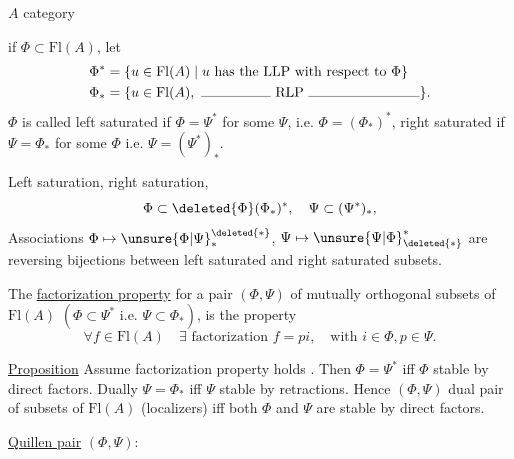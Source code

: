 
$A$ category

if $\Phi\subset\mathrm{Fl}(A)$, let
\[
\begin{aligned}
\Phi^*&=\{u\in\mathrm{Fl}(A)\mid u\text{ has the LLP with respect to }\Phi\}\\
\Phi_*&=\{u\in\mathrm{Fl}(A),\ \text{\rule{5em}{.3pt}}\ \mathrm{RLP}\ \text{\rule{8em}{.3pt}}\}.
\end{aligned}
\]
$\Phi$ is called left saturated if $\Phi=\Psi^*$ for some $\Psi$, i.e. $\Phi=(\Phi_*)^*$,
\inserted{$\Psi$} right saturated if  $\Psi=\Phi_*$ for some $\Phi$ i.e. $\Psi=(\Psi^*)_*$.

Left saturation, right saturation,
\[
\Phi\subset\deleted{\Phi}(\Phi_*)^*,\quad \Psi\subset(\Psi^*)_*,
\]
Associations $\Phi\mapsto\unsure{\Phi|\Psi}_*^{\deleted{*}}$, $\Psi\mapsto\unsure{\Psi|\Phi}^{*}_{\deleted{*}}$ are  reversing bijections between left saturated and right saturated subsets.


The \uline{factorization property} for a pair $(\Phi,\Psi)$ of mutually orthogonal subsets of $\mathrm{Fl}(A)$ $(\Phi\subset\Psi^*\text{ i.e. }\Psi\subset\Phi_*)$, is the property 
\[
\forall f\in\mathrm{Fl}(A)\quad\exists\text{ factorization }f=pi,\quad\text{with }i\in\Phi,p\in\Psi.
\]

 
\uline{Proposition} Assume factorization property holds .
Then $\Phi=\Psi^*$ iff $\Phi$ stable by direct factors. Dually $\Psi=\Phi_*$ iff $\Psi$ stable by retractions. Hence $(\Phi,\Psi)$  dual pair of subsets of $\mathrm{Fl}(A)$ (localizers) iff   both $\Phi$ and $\Psi$ are stable by direct factors.

\uline{Quillen pair} $(\Phi,\Psi)$:

